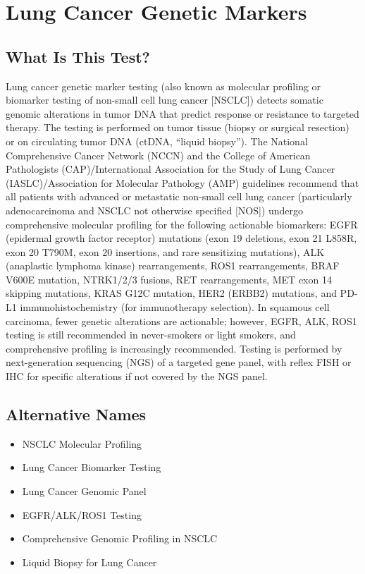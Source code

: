 \chapter{Lung Cancer Genetic Markers}

\section*{What Is This Test?}
Lung cancer genetic marker testing (also known as molecular profiling or biomarker testing of non-small cell lung cancer [NSCLC]) detects somatic genomic alterations in tumor DNA that predict response or resistance to targeted therapy. The testing is performed on tumor tissue (biopsy or surgical resection) or on circulating tumor DNA (ctDNA, ``liquid biopsy''). The National Comprehensive Cancer Network (NCCN) \cite{nccn2024non} and the College of American Pathologists (CAP)/International Association for the Study of Lung Cancer (IASLC)/Association for Molecular Pathology (AMP) guidelines \cite{lindeman2018updated} recommend that all patients with advanced or metastatic non-small cell lung cancer (particularly adenocarcinoma and NSCLC not otherwise specified [NOS]) undergo comprehensive molecular profiling for the following actionable biomarkers: EGFR (epidermal growth factor receptor) mutations (exon 19 deletions, exon 21 L858R, exon 20 T790M, exon 20 insertions, and rare sensitizing mutations), ALK (anaplastic lymphoma kinase) rearrangements, ROS1 rearrangements, BRAF V600E mutation, NTRK1/2/3 fusions, RET rearrangements, MET exon 14 skipping mutations, KRAS G12C mutation, HER2 (ERBB2) mutations, and PD-L1 immunohistochemistry (for immunotherapy selection). In squamous cell carcinoma, fewer genetic alterations are actionable; however, EGFR, ALK, ROS1 testing is still recommended in never-smokers or light smokers, and comprehensive profiling is increasingly recommended. Testing is performed by next-generation sequencing (NGS) of a targeted gene panel, with reflex FISH or IHC for specific alterations if not covered by the NGS panel.

\section*{Alternative Names}
\begin{itemize}
  \item NSCLC Molecular Profiling
  \item Lung Cancer Biomarker Testing
  \item Lung Cancer Genomic Panel
  \item EGFR/ALK/ROS1 Testing
  \item Comprehensive Genomic Profiling in NSCLC
  \item Liquid Biopsy for Lung Cancer
\end{itemize}
